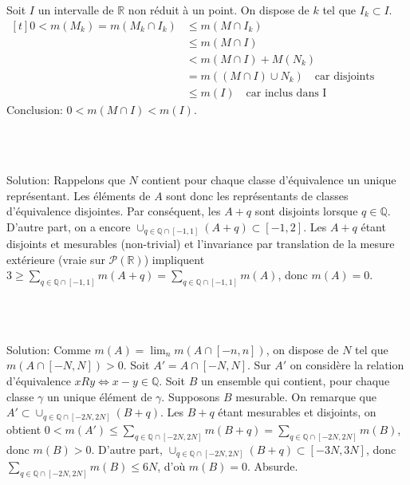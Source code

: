 \documentclass{report}
\begin{document}
 Soit $I$ un intervalle de $\mathbb R$ non réduit à un point. On dispose de $k$ tel que $I_k\subset I$.\newline
 $\begin{aligned}[t]0<m(M_k) = m(M_k\cap I_k)&\leq m(M\cap I_k)\\
 &\leq m(M\cap I)\\
 &< m(M\cap I) + M(N_k) \\
 &= m((M\cap I)\cup N_k) \quad \text{car disjoints}\\
 &\leq m(I) \quad \text{car inclus dans I}\end{aligned}$\newline
 Conclusion: $0<m(M\cap I)<m(I)$.

\subsection{} \\ \\

Solution: Rappelons que $N$ contient pour chaque classe d'équivalence un unique représentant. Les éléments de $A$ sont donc les représentants de classes d'équivalence disjointes. Par conséquent, les $A+q$ sont disjoints lorsque $q\in \mathbb Q$. D'autre part, on a encore $\cup_{q\in \mathbb Q \cap [-1,1]} (A+q) \subset [-1,2]$. Les $A+q$ étant disjoints et mesurables (non-trivial) et l'invariance par translation de la mesure extérieure (vraie sur $\mathcal P(\mathbb R)$) impliquent $3\geq \sum_{q\in \mathbb Q \cap [-1,1]} m(A+q) = \sum_{q\in \mathbb Q \cap [-1,1]} m(A)$, donc $m(A)=0$.

\subsection{} \\ \\

Solution: Comme $m(A) = \lim_n m(A\cap [-n,n])$, on dispose de $N$ tel que $m(A\cap [-N,N])>0$. Soit $A'=A\cap [-N,N]$. Sur $A'$ on considère la relation d'équivalence $xRy\iff x-y\in\mathbb Q$. Soit $B$ un ensemble qui contient, pour chaque classe $\gamma$ un unique élément de $\gamma$. Supposons $B$ mesurable. On remarque que $A'\subset \cup_{q\in \mathbb Q\cap [-2N,2N]}(B+q)$. Les $B+q$ étant mesurables et disjoints, on obtient $0<m(A')\leq \sum_{q\in \mathbb Q\cap [-2N,2N]}m(B+q) = \sum_{q\in \mathbb Q\cap [-2N,2N]}m(B) $, donc $m(B)>0$. \newline
D'autre part, $\cup_{q\in \mathbb Q\cap [-2N,2N]}(B+q) \subset [-3N,3N]$, donc $\sum_{q\in \mathbb Q\cap [-2N,2N]}m(B) \leq 6N$, d'où $m(B)=0$.\newline
Absurde.
\end{document}
